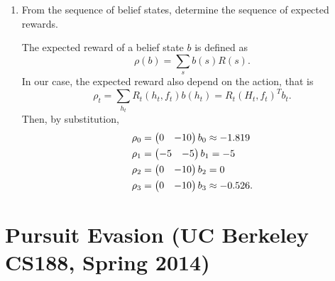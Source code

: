 \documentclass[11pt, a4paper]{article}
\begin{document}
\begin{enumerate}
    \item From the sequence of belief states, determine the sequence of expected rewards.
    
    \begin{solution}
        The expected reward of a belief state $b$ is defined as
        \begin{equation*}
            \rho(b) = \sum_s b(s) R(s) .
        \end{equation*}
        In our case, the expected reward also depend on the action, that is
        \begin{equation*}
            \rho_t = \sum_{h_t} R_t(h_t, f_t) b(h_t) = R_t(H_t, f_t)^T b_t.
        \end{equation*}
        Then, by substitution,
        \begin{align*}
            \rho_0 & = \begin{pmatrix}0 & -10\end{pmatrix} b_0 \approx -1.819 \\
            \rho_1 & = \begin{pmatrix}-5 & -5\end{pmatrix} b_1 = -5 \\
            \rho_2 & = \begin{pmatrix}0 & -10\end{pmatrix} b_2 = 0 \\
            \rho_3 & = \begin{pmatrix}0 & -10\end{pmatrix} b_3 \approx -0.526 .
        \end{align*}
    \end{solution}
\end{enumerate}

\newpage

\section{Pursuit Evasion (UC Berkeley CS188, Spring 2014)}
\end{document}

